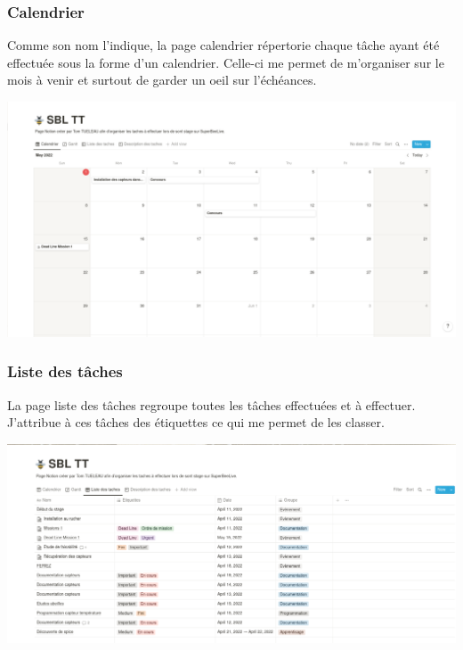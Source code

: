 \documentclass[11pt,french,a4paper]{article}
\begin{document}
\subsubsection{Calendrier}
Comme son nom l'indique, la page calendrier répertorie chaque tâche ayant été effectuée sous la forme d'un calendrier. Celle-ci me permet de m'organiser sur le mois à venir et surtout de garder un oeil sur l'échéances. 
\begin{center}	
\includegraphics[scale=0.35]{../img/notioncalender.png}
\label{Calendrier}
\end{center}

\subsubsection{Liste des tâches}
La page liste des tâches regroupe toutes les tâches effectuées et à effectuer. J'attribue à ces tâches des étiquettes ce qui me permet de les classer.   
\begin{center}	
\includegraphics[scale=0.35]{../img/notionlistesdestaches.png}
\label{Liste des taches}
\end{center}
\end{document}
